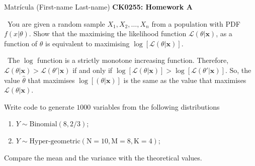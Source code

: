 \documentclass[11pt]{article}
\newenvironment{EX}[2][Exercise]{\begin{trivlist}
\item[{\color{red} \hskip \labelsep {\bfseries #1}\hskip \labelsep {\bfseries #2.}}]}{\end{trivlist}}
\newenvironment{SL}[1][Solution]{\begin{trivlist}
\item[{\color{blue} \hskip \labelsep {\bfseries #1:}}]}{\end{trivlist}}
\begin{document}

\noindent Matr\'icula (First-name Last-name) \hfill {\Large \bfseries CK0255: Homework A} \\

\begin{EX}{A.1}\
You are given a random sample $X_1,X_2,\dots,X_n$ from a population with PDF $f(x|\theta)$. Show that the maximising the likelihood function $\mathcal{L}(\theta|\mathbf{x})$, as a function of $\theta$ is equivalent to maximising $\log{[\mathcal{L}(\theta|\mathbf{x})]}$.
\end{EX}

\begin{SL}\
The $\log$ function is a strictly monotone increasing function. Therefore, $\mathcal{L}(\theta|\mathbf{x}) > \mathcal{L}(\theta'|\mathbf{x})$ if and only if $\log{[\mathcal{L}(\theta|\mathbf{x})]} > \log{[\mathcal{L}(\theta'|\mathbf{x})]}$.
\vskip0.250cm
\noindent
So, the value $\hat{\theta}$ that maximises $\log{[(\theta|\mathbf{x})]}$ is the same as the value that maximises $\mathcal{L}(\theta|\mathbf{x})$.
\end{SL}


\begin{EX}{A.2}
Write code to generate $1000$ variables from the following distributions
\begin{enumerate}
\item $Y \sim \text{Binomial}(8,{2}/{3})$;
\item $Y \sim \text{Hyper-geometric}(\text{N}=10,\text{M}=8,\text{K}=4)$;\end{enumerate}
Compare the mean and the variance  with the theoretical values.
\end{EX}
\end{document}
